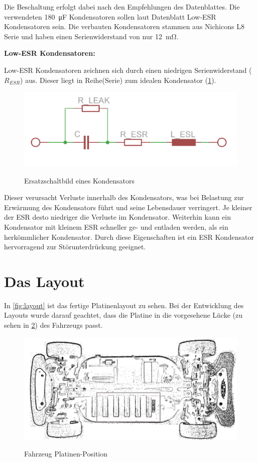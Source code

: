 Die Beschaltung erfolgt dabei nach den Empfehlungen des Datenblattes. Die verwendeten \SI{180}{\micro\farad} Kondensatoren sollen laut Datenblatt Low-ESR Kondensatoren sein. 
Die verbauten Kondensatoren stammen aus Nichicons L8 Serie und haben einen Serienwiderstand von nur \SI{12}{\milli\ohm}.

\textbf{Low-ESR Kondensatoren:\\}

Low-ESR Kondensatoren zeichnen sich durch einen niedrigen Serienwiderstand ($R_{ESR}$) aus.
Dieser liegt in Reihe(Serie) zum idealen Kondensator (\cref{fig:esr}). 

\begin{figure}[H]
\centering
\includegraphics[width=.56\textwidth]{esr.png}\\
\caption{Ersatzschaltbild eines Kondensators}%
\label{fig:esr}
\end{figure}

Dieser verursacht Verluste innerhalb des Kondensators, was bei Belastung zur Erwärmung des Kondensators führt und
seine Lebensdauer verringert. Je kleiner der ESR desto niedriger die Verluste im Kondensator. Weiterhin
kann ein Kondensator mit kleinem ESR schneller ge- und entladen werden, als ein herkömmlicher Kondensator.
Durch diese Eigenschaften ist ein ESR Kondensator hervorragend zur Störunterdrückung geeignet.






\section{Das Layout}
In \cref{fig:layout} ist das fertige Platinenlayout zu sehen. Bei der Entwicklung des Layouts wurde darauf geachtet, dass die Platine in die vorgesehene Lücke (zu sehen in \cref{fig:car_struc}) des Fahrzeugs passt.

\begin{figure}[H]
\centering
\includegraphics[width=.8\textwidth]{auto_struck.png}\\
\caption{Fahrzeug Platinen-Position}%
\label{fig:car_struc}
\end{figure}

